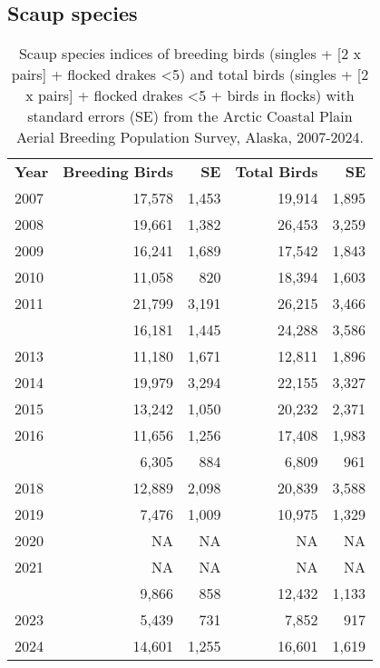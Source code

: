 \documentclass[
]{article}
\begin{document}
\subsection*{Scaup species}\label{scaup-species-1}

\begingroup\fontsize{10}{12}\selectfont

\begin{longtable}[t]{lrrrr}

\caption{\label{tbl-UNSC}Scaup species indices of breeding birds
(singles + {[}2 x pairs{]} + flocked drakes \textless5) and total birds
(singles + {[}2 x pairs{]} + flocked drakes \textless5 + birds in
flocks) with standard errors (SE) from the Arctic Coastal Plain Aerial
Breeding Population Survey, Alaska, 2007-2024.}

\tabularnewline

\\
\toprule
\textbf{Year} & \textbf{Breeding Birds} & \textbf{SE} & \textbf{Total Birds} & \textbf{SE}\\
\midrule
2007 & 17,578 & 1,453 & 19,914 & 1,895\\
2008 & 19,661 & 1,382 & 26,453 & 3,259\\
2009 & 16,241 & 1,689 & 17,542 & 1,843\\
2010 & 11,058 & 820 & 18,394 & 1,603\\
2011 & 21,799 & 3,191 & 26,215 & 3,466\\
\addlinespace
2012 & 16,181 & 1,445 & 24,288 & 3,586\\
2013 & 11,180 & 1,671 & 12,811 & 1,896\\
2014 & 19,979 & 3,294 & 22,155 & 3,327\\
2015 & 13,242 & 1,050 & 20,232 & 2,371\\
2016 & 11,656 & 1,256 & 17,408 & 1,983\\
\addlinespace
2017 & 6,305 & 884 & 6,809 & 961\\
2018 & 12,889 & 2,098 & 20,839 & 3,588\\
2019 & 7,476 & 1,009 & 10,975 & 1,329\\
2020 & NA & NA & NA & NA\\
2021 & NA & NA & NA & NA\\
\addlinespace
2022 & 9,866 & 858 & 12,432 & 1,133\\
2023 & 5,439 & 731 & 7,852 & 917\\
2024 & 14,601 & 1,255 & 16,601 & 1,619\\
\bottomrule

\end{longtable}
\end{document}
